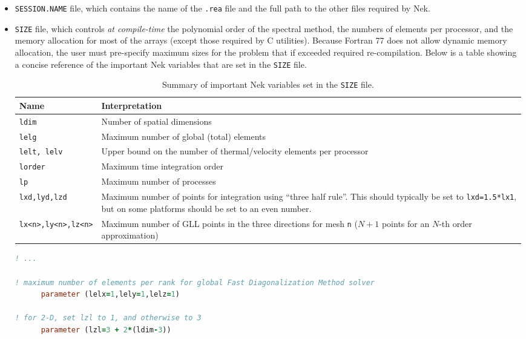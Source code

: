\documentclass[10pt]{article}
\numberwithin{equation}{section} %
\begin{document}
\begin{itemize}
\item {\tt SESSION.NAME} file, which contains the name of the {\tt .rea} file and the full path to the other files required by Nek. 

\item {\tt SIZE} file, which controls {\it at compile-time} the polynomial order of the spectral method, the numbers of elements per processor, and the memory allocation for most of the arrays (except those required by C utilities). Because Fortran 77 does not allow dynamic memory allocation, the user must pre-specify maximum sizes for the problem that if exceeded required re-compilation. Below is a table showing a concise reference of the important Nek variables that are set in the {\tt SIZE} file.

\begin{table}[H]
\caption{Summary of important Nek variables set in the {\tt SIZE} file.}
\centering
\begin{tabular}{p{3.5cm}p{11.5cm}}
\hline\hline
Name & Interpretation \\ [0.5ex]
\hline
{\tt ldim} & Number of spatial dimensions\\
{\tt lelg} & Maximum number of global (total) elements\\
{\tt lelt, lelv} & Upper bound on the number of thermal/velocity elements per processor\\
{\tt lorder} & Maximum time integration order\\
{\tt lp} & Maximum number of processes\\
{\tt lxd,lyd,lzd} & Maximum number of points for integration using ``three half rule''. This should typically be set to {\tt lxd=1.5*lx1}, but on some platforms should be set to an even number.\\
{\tt lx<n>,ly<n>,lz<n>} & Maximum number of GLL points in the three directions for mesh {\tt n} (\(N+1\) points for an \(N\)-th order approximation)\\
\hline
\end{tabular}
\end{table}

\begin{lstlisting}[language=Fortran]
! ...

! maximum number of elements per rank for global Fast Diagonalization Method solver
      parameter (lelx=1,lely=1,lelz=1)

! for 2-D, set lzl to 1, and otherwise to 3
      parameter (lzl=3 + 2*(ldim-3))


\end{lstlisting}
\end{itemize}
\end{document}
